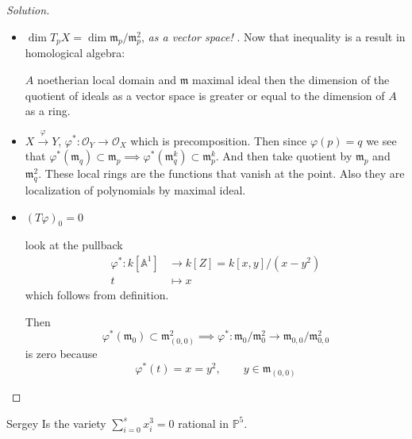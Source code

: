 \begin{proof}[Solution]\leavevmode
\begin{itemize}
\item $\dim T_pX=\dim \mathfrak{m}_p/\mathfrak{m}^2_p$, \textit{ as a vector space!} . Now that inequality is a result in homological algebra:
	\begin{thm}
		$A$ noetherian local domain and $ \mathfrak{m}$ maximal ideal then the dimension of the quotient of ideals as a vector space is greater or equal to the dimension of $A$ as a ring.
	\end{thm}
	\item 
		\begin{defn}
			$X\overset{\varphi}{\longrightarrow}Y$, $\varphi^*:\mathcal{O}_Y\to \mathcal{O}_X$ which is precomposition. Then since $\varphi(p)=q$ we see that $\varphi^*(\mathfrak{m}_q)\subset \mathfrak{m}_p\implies \varphi^* (\mathfrak{m}^k_q)\subset \mathfrak{m}^k_{p}$. And then take quotient by $\mathfrak{m}_{p}$ and $\mathfrak{m}^2_{q}$. These local rings are the functions that vanish at the point. Also they are localization of polynomials by maximal ideal.
		\end{defn}
\item
	 \begin{claim}
		 $(T\varphi)_0=0$
	\end{claim}
	look at the pullback
	\begin{align*}
		\varphi^*: k[\mathbb{A}^1] &\longrightarrow k[Z]=k[x,y]/(x-y^2) \\
		t &\longmapsto x
	\end{align*}
	which follows from definition.
	
	Then
	\[\varphi^*(\mathfrak{m}_{0})\subset \mathfrak{m}^2_{(0,0)}\implies \varphi^* :\mathfrak{m}_0/\mathfrak{m}_0^2\to \mathfrak{m}_{0,0}/\mathfrak{m}_{0,0}^2\]
	is zero because
	\[\varphi^* (t)=x=y^2,\qquad y\in\mathfrak{m}_{(0,0)}\]
	
\end{itemize}\end{proof}




\begin{manualexercise}{Sergey}
	Is the variety $\sum_{i=0}^sx_i^3=0$ rational in $\mathbb{P}^5$.
\end{manualexercise}




